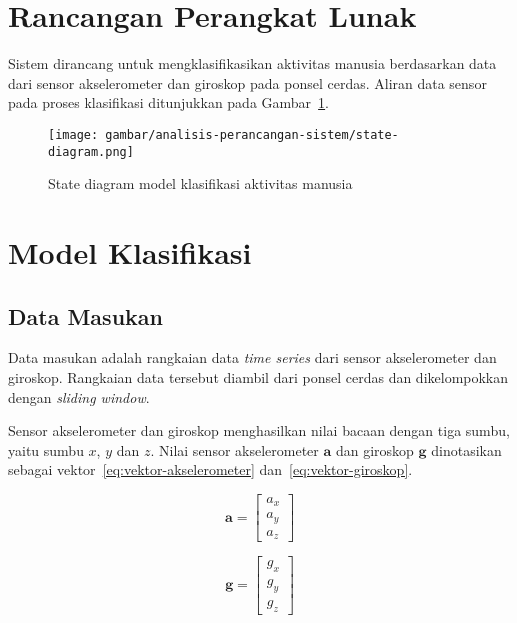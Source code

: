 %
%
\section{Rancangan Perangkat Lunak}
Sistem dirancang untuk mengklasifikasikan aktivitas manusia berdasarkan data dari sensor akselerometer dan giroskop pada ponsel cerdas. Aliran data sensor pada proses klasifikasi ditunjukkan pada Gambar~\ref{gambar:state-diagram-sistem}.

\begin{figure}
    \centering
    \texttt{[image: gambar/analisis-perancangan-sistem/state-diagram.png]}
    \caption{State diagram model klasifikasi aktivitas manusia}
    \label{gambar:state-diagram-sistem}
\end{figure}

\section{Model Klasifikasi}

\subsection{Data Masukan}
Data masukan adalah rangkaian data \textit{time series} dari sensor akselerometer dan giroskop. Rangkaian data tersebut diambil dari ponsel cerdas dan dikelompokkan dengan \textit{sliding window}.

Sensor akselerometer dan giroskop menghasilkan nilai bacaan dengan tiga sumbu, yaitu sumbu $x$, $y$ dan $z$. Nilai sensor akselerometer $\pmb{a}$ dan giroskop $\pmb{g}$ dinotasikan sebagai vektor~\ref{eq:vektor-akselerometer} dan~\ref{eq:vektor-giroskop}.

\begin{equation}
    \label{eq:vektor-akselerometer}
    \pmb{a} = 
    \begin{bmatrix}
        a_x \\
        a_y \\
        a_z
    \end{bmatrix}
\end{equation}

\begin{equation}
    \label{eq:vektor-giroskop}
    \pmb{g} = 
    \begin{bmatrix}
        g_x \\
        g_y \\
        g_z
    \end{bmatrix}
\end{equation}

